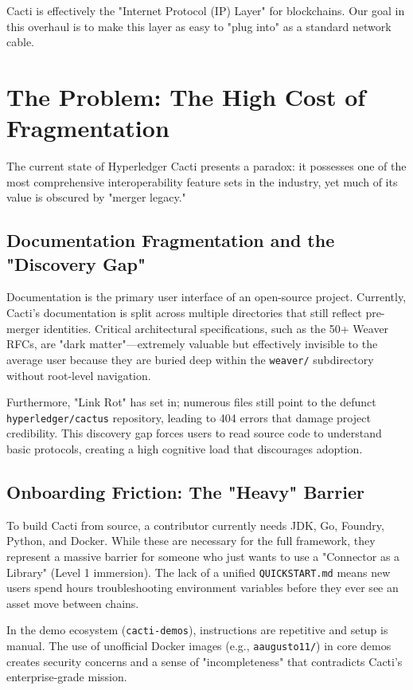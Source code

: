 Cacti is effectively the "Internet Protocol (IP) Layer" for blockchains. Our goal in this overhaul is to make this layer as easy to "plug into" as a standard network cable.

\section{The Problem: The High Cost of Fragmentation}

The current state of Hyperledger Cacti presents a paradox: it possesses one of the most comprehensive interoperability feature sets in the industry, yet much of its value is obscured by "merger legacy." 

\subsection{Documentation Fragmentation and the "Discovery Gap"}
Documentation is the primary user interface of an open-source project. Currently, Cacti's documentation is split across multiple directories that still reflect pre-merger identities. Critical architectural specifications, such as the 50+ Weaver RFCs, are "dark matter"—extremely valuable but effectively invisible to the average user because they are buried deep within the \texttt{weaver/} subdirectory without root-level navigation. 

Furthermore, "Link Rot" has set in; numerous files still point to the defunct \texttt{hyperledger/cactus} repository, leading to 404 errors that damage project credibility. This discovery gap forces users to read source code to understand basic protocols, creating a high cognitive load that discourages adoption.

\subsection{Onboarding Friction: The "Heavy" Barrier}
To build Cacti from source, a contributor currently needs JDK, Go, Foundry, Python, and Docker. While these are necessary for the full framework, they represent a massive barrier for someone who just wants to use a "Connector as a Library" (Level 1 immersion). The lack of a unified \texttt{QUICKSTART.md} means new users spend hours troubleshooting environment variables before they ever see an asset move between chains. 

In the demo ecosystem (\texttt{cacti-demos}), instructions are repetitive and setup is manual. The use of unofficial Docker images (e.g., \texttt{aaugusto11/}) in core demos creates security concerns and a sense of "incompleteness" that contradicts Cacti's enterprise-grade mission.

